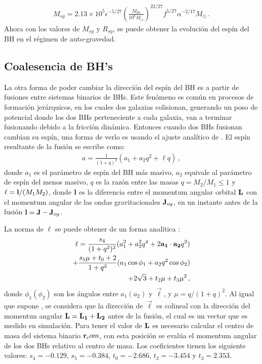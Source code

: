 %
\begin{align}
    M_{sg} = 2.13\times 10^{5}\epsilon^{-5/27}\left(\frac{M_{bh}}{10^{8}M_{\odot}} \right)^{23/27}f^{5/27}\alpha^{-2/17}M_{\odot}\,.
\end{align}
%
Ahora con los valores de $M_{sg}$ y $R_{sg}$, se puede obtener la evolución del espín del BH en el régimen de auto-gravedad.


\subsection{Coalesencia de BH's}
\label{subsec: Acrecion_gas}
La otra forma de poder cambiar la dirección del espín del BH es a partir de fusiones entre  sistemas binarios de BHs. Este fenómeno es común en procesos de formación jerárquicos, en los cuales dos galaxias colisionan, generando un poso de potencial donde los dos BHs perteneciente a cada galaxia, van a terminar fusionando debido a la fricción dinámica. Entonces cuando dos BHs fusionan cambian su espín, una forma de verlo es usando el ajuste analítico de \cite{rezzolla2008}. El espín resultante de la fusión se escribe como:
%
\begin{align}
    a = \frac{1}{(1+q)^{2}}(a_{1}+a_{2}q^{2}+\ell q)\,,
\end{align}
%
donde $a_{1}$ es el parámetro de espín del BH más masivo, $a_{2}$ equivale al parámetro de espín del menos masivo, $q$ es la razón entre las masas $q=M_{2}/M_{1}\leq 1$ y $ \ell = {\bf{l}}/(M_{1}M_{2})$, donde ${\bf{l}}$ es la diferencia entre el momentum angular orbital ${\bf{L}}$ con el momentum angular de las ondas gravitacionales ${\bf{J}}_{og}$, en un instante antes de la fusión ${\bf{l}}={\bf{J}}-{\bf{J}}_{og}$.

La norma de $\ell$ se puede obtener de un forma analítica \cite{rezzolla2008}: 
%
\begin{align}
    \ell = \frac{s_{4}}{(1+q^{2})^{2}}(a_{1}^{2}+a_{2}^{2}q^{4}+2{\bf{a_{1}\cdot a_{2}}}q^{2})\\ + \frac{s_{5}\mu + t_{0}+2}{1+q^{2}}(a_{1}\cos\phi_{1}+a_{2}q^{2}\cos\phi_{2})\\ 
    + 2\sqrt{3}+t_{2}\mu+t_{3}\mu^{2}\,,
\end{align}
donde $\phi_{1}(\phi_{2})$ son los ángulos entre $a_{1}(a_{2})$ y $\vec{\ell}$, y $\mu = q/(1+q)^{2}$. Al igual que supone \cite{rezzolla2008}, se considera que la dirección de $\Vec{\ell}$ es colineal con la dirección del momentun angular ${\bf{L=L_{1}+L_{2}}}$ antes de la fusión, el cual es un vector que es medido en simulación. Para tener el valor de ${\bf{L}}$ es necesario calcular el centro de masa del sistema binario ${\bf{r}}_com$, con esta posición se evalúa el momentum angular de los dos BHs relativo al centro de masa. Los coeficientes tienen los siguiente valores: $s_{4}=-0.129$, $s_{5}=-0.384$, $t_{0}=-2.686$, $t_{2}=-3.454$ y $t_{3}=2.353$.

